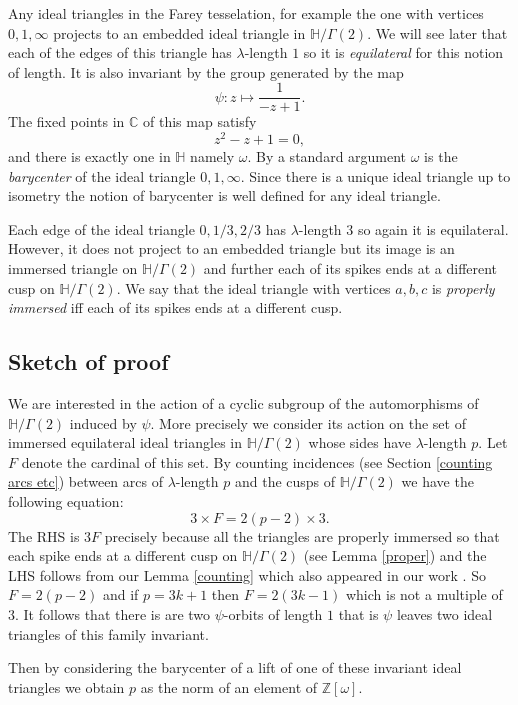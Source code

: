 \documentclass[12pt]{amsart}
\theoremstyle{plain}
\theoremstyle{definition}
\def\HH{\mathbb{H}}
\def\xx{\HH/g2}
\def\ZZ{\mathbb{Z}}
\def\CC{\mathbb{C}}
\def\g2{\Gamma(2)}
\def\xx{\HH/\g2}
\begin{document}
Any  ideal triangles in the Farey tesselation, 
for example the one with vertices $0,1,\infty$
projects to an embedded ideal triangle in $\xx$.
We will see later that each of the edges
of this triangle has $\lambda$-length $1$
so it is \textit{equilateral} for this notion of length.
It is also invariant by the group generated by the map
$$ \psi: z \mapsto \frac{1}{-z + 1 }.$$
The fixed points in $\CC$ of this map satisfy
$$z^2  - z + 1 = 0,$$
and there is exactly one in $\HH$ 
namely $\omega$.
By a standard argument $\omega$ is the \textit{barycenter} 
of the ideal triangle $0,1,\infty$.
Since there is a unique ideal triangle up to isometry 
the notion of barycenter is well defined for any ideal triangle.


Each edge of the  ideal triangle $0,1/3,2/3$
has $\lambda$-length $3$ 
so again it is equilateral.
However, it does not project to  an embedded triangle
but its image is an immersed triangle on $\xx$
and further each of its spikes ends at a different cusp on 
$\xx$.
We say that the ideal triangle with vertices 
 $a,b,c$ is \textit{properly immersed}
iff each of its spikes ends at a different cusp.


\subsection{Sketch of proof}

We are interested in the action of a cyclic subgroup of the 
automorphisms of $\xx$ induced by $\psi$.
More precisely we consider its action on the
set of immersed equilateral ideal triangles in $\xx$
whose sides have $\lambda$-length $p$.
Let $F$ denote the cardinal of this set.
By counting incidences  (see Section \ref{counting arcs etc}) between  
arcs of $\lambda$-length $p$
and the cusps of $\xx$
we  have the following equation:
\begin{equation} \label{incidence}
3 \times F = 2 (p-2) \times 3.
\end{equation}
The RHS is $3F$ precisely because all the  triangles
are properly immersed so that each spike ends at a
different cusp on $\xx$ (see Lemma \ref{proper})
and the LHS follows from our Lemma \ref{counting}
which also  appeared in our work \cite{vlad}.
So $F = 2(p-2)$ and  if $p= 3k + 1$ then $F = 2(3k -1)$
which is not a multiple of $3$.
It follows that there is are two $\psi$-orbits of length $1$
that is $\psi$ leaves two ideal triangles of this family invariant.


Then  by considering the barycenter
of a lift of one of these invariant ideal triangles
we obtain $p$ as the norm of an element of $\ZZ[\omega]$.
\end{document}
